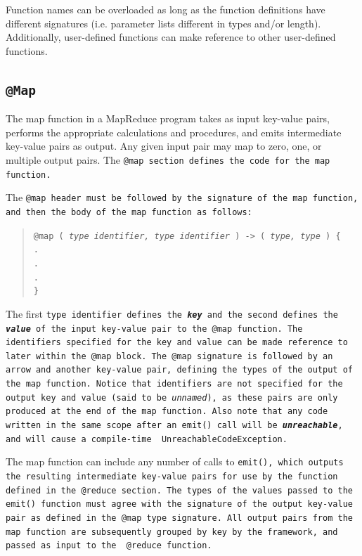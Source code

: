 \documentclass{article}
\begin{document}
Function names can be overloaded as long as the function definitions have different
signatures (i.e. parameter lists different in types and/or length). Additionally,
user-defined functions can make reference to other user-defined functions.


\subsection{\tt @Map \rm} %
\label{sub:tt_map_rm}

The map function in a MapReduce program takes as input key-value pairs, performs
the appropriate calculations and procedures, and emits intermediate key-value pairs
as output. Any given input pair may map to zero, one, or multiple output pairs. The
\tt @map \rm section defines the code for the map function.

The \tt @map \rm header must be followed by the signature of the map function, and
then the body of the map function as follows:

\begin{quotation}
  \tt @map ( \rm \emph{type identifier, type identifier} \tt ) -> ( \rm \emph{type, type} \tt ) \{ \\
  \indent \indent . \\
  \indent \indent . \\
  \indent \indent . \\
  \indent \tt \} \rm
\end{quotation}

The first \tt type identifier \rm defines the \emph{\textbf{key}} and the second defines the \emph{\textbf{value}} of the input
key-value pair to the \tt @map \rm function. The identifiers specified for the key and value can be made reference to later
within the \tt @map \rm block. The \tt @map \rm signature is followed by an arrow and another key-value pair, defining the
types of the output of the map function. Notice that identifiers are not specified for the output key and value (said to be
\emph{unnamed}), as these pairs are only produced at the end of the map function. Also note that any code written in the same
scope after an \tt emit() \rm call will be \textbf{\emph{unreachable}}, and will cause a compile-time \tt
UnreachableCodeException\rm.

The map function can include any number of calls to \tt emit()\rm, which outputs
the resulting intermediate key-value pairs for use by the function defined in the
\tt @reduce \rm section. The types of the values passed to the \tt emit() \rm
function must agree with the signature of the output key-value pair as defined in
the \tt @map \rm type signature. All output pairs from the map function are
subsequently grouped by key by the framework, and passed as input to the \tt
@reduce \rm function.
\end{document}
